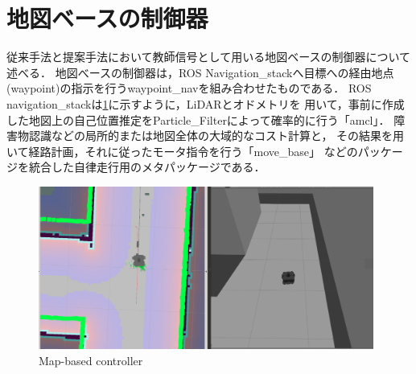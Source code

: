 \section{地図ベースの制御器}
    \label{seigyo}
    従来手法と提案手法において教師信号として用いる地図ベースの制御器について述べる．
    地図べースの制御器は，ROS Navigation\_stack\cite{navigation:online}へ目標への経由地点(waypoint)の指示を行うwaypoint\_navを組み合わせたものである．
    ROS navigation\_stackは\ref{fig::mapbase}に示すように，LiDARとオドメトリを
    用いて，事前に作成した地図上の自己位置推定をParticle\_Filterによって確率的に行う「amcl」．
    障害物認識などの局所的または地図全体の大域的なコスト計算と，
    その結果を用いて経路計画，それに従ったモータ指令を行う「move\_base」
    などのパッケージを統合した自律走行用のメタパッケージである．
    
    

    \begin{figure}[H]
        \centering
        \includegraphics[width = 11cm]{./figs/mapbased.png}
        \caption{Map-based controller}
        \label{fig::mapbase}
    \end{figure}
\newpage
